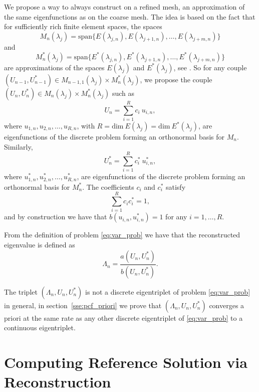 \documentclass[preprint,12pt]{elsarticle}
\begin{document}
We propose a way to always construct on a refined mesh, an approximation of the same eigenfunctions as on the coarse mesh. The idea is based on the fact that for sufficiently rich finite element spaces, the spaces
$$
M_n(\lambda_j)=\mathrm{span}\{E(\lambda_{j,n}),E(\lambda_{j+1,n}),\dots, E(\lambda_{j+m,n})\}
$$ 
and 
$$
M_n^*(\lambda_j)=\mathrm{span}\{E^*(\lambda_{j,n}),E^*(\lambda_{j+1,n}),\dots, E^*(\lambda_{j+m,n})\}
$$ 
are approximations of the spaces $E(\lambda_j)$ and $E^*(\lambda_j)$, see \cite{babuska}. 
So for any couple $(U_{n-1},U_{n-1}^*)\in M_{n-1,1}(\lambda_j)\times M_{n}^*(\lambda_j)$, we propose the couple $(U_{n},U_{n}^*)\in M_{n}(\lambda_j)\times M_{n}^*(\lambda_j)$ such as
\begin{equation}\label{eq:const}
U_n=\sum_{i=1}^{R} c_i \ u_{i,n},
\end{equation}
where $u_{1,n},u_{2,n},\dots,u_{R,n}$, with $R=\mathrm{dim}\ E(\lambda_j)=\mathrm{dim}\ E^*(\lambda_j)$, are eigenfunctions of the discrete problem forming  an orthonormal basis for
$M_{n}$.
Similarly,
\begin{equation}\label{eq:const_star}
U_n^*=\sum_{i=1}^{R} c_i^* \ u_{i,n}^*,
\end{equation}
where $u_{1,n}^*,u_{2,n}^*,\dots,u_{R,n}^*$, are eigenfunctions of the discrete problem forming  an orthonormal basis for
$M_{n}^*$.
 The coefficients $c_i$ and $c_i^*$ satisfy 
\begin{equation}\label{eq:cond_on_corf}
\sum_{i=1}^{R} c_ic_i^*=1,
\end{equation}
and by construction we have that $b(u_{i,n},u_{i,n}^*)=1$ for any $i=1,\dots,R$.

From the definition of problem \eqref{eq:var_prob} we have that the reconstructed eigenvalue is defined as
$$
\Lambda_n=\frac{a(U_n,U_n^*)}{b(U_n,U_n^*)}.
$$

The triplet $(\Lambda_n,U_n,U_n^*)$ is not a discrete eigentriplet of problem \eqref{eq:var_prob} in general, in section~\ref{sse:pcf_priori} we prove that $(\Lambda_n,U_n,U_n^*)$ converges a priori at the same rate as any other discrete eigentriplet of \eqref{eq:var_prob} to a continuous eigentriplet.

\section{Computing Reference Solution via Reconstruction}\label{sec:recoref}
\end{document}
